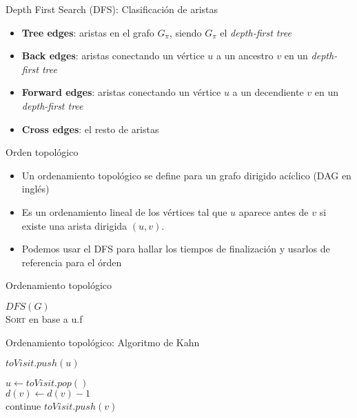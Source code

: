 \documentclass[]{beamer}
\begin{document}
\begin{frame}{Depth First Search (DFS): Clasificaci\'on de aristas}
  \begin{itemize}
    \item \textbf{Tree edges}: aristas en el grafo $G_{\pi}$, siendo $G_{\pi}$ el \textit{depth-first tree}
      \pause
    \item \textbf{Back edges}: aristas conectando un v\'ertice $u$ a un ancestro $v$ en un \textit{depth-first tree}
      \pause
    \item \textbf{Forward edges}: aristas conectando un v\'ertice $u$ a un decendiente $v$ en un \textit{depth-first tree}
      \pause
    \item \textbf{Cross edges}: el resto de aristas
  \end{itemize}
\end{frame}

\begin{frame}{Orden topol\'ogico}
  \begin{itemize}
    \item Un ordenamiento topol\'ogico se define para un grafo dirigido ac\'iclico (DAG en ingl\'es)
      \pause
    \item Es un ordenamiento lineal de los v\'ertices tal que $u$ aparece antes de $v$ si existe una arista dirigida $(u,v)$. 
      \pause
    \item Podemos usar el DFS para hallar los tiempos de finalizaci\'on y usarlos de referencia para el \'orden
  \end{itemize}
\end{frame}

\begin{frame}{Ordenamiento topol\'ogico}
  \begin{algorithm}[H]
    \textsc{$DFS(G)$} \\
    \textsc{Sort} en base a u.f
  \end{algorithm}
\end{frame}

\begin{frame}{Ordenamiento topol\'ogico: Algoritmo de Kahn}
  \begin{algorithm}[H]
    {
      {
        {$ toVisit.push(u) $} 
      }
    }

    {
      $ u \gets toVisit.pop() $ \\
      {
        { $d(v) \gets d(v)-1 $} \\
        {
          continue
        }
        $ toVisit.push(v) $
      }
    }
  \end{algorithm}
\end{frame}
\end{document}
